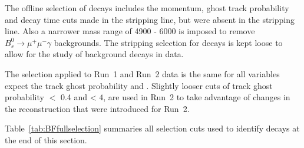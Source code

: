 The offline selection of \bmumu decays includes the momentum, ghost track probability and decay time cuts made in the \bhh stripping line, but were absent in the \bmumu stripping line. Also a narrower mass range of 4900 - 6000 \mevcc is imposed to remove $B_{s}^{0} \to \mu^{+} \mu^{-} \gamma$ backgrounds. The stripping selection for \bmumu decays is kept loose to allow for the study of background decays in data. 

The selection applied to Run~1 and Run~2 data is the same for all variables expect the track ghost probability and \chitrk. Slightly looser cuts of track ghost probability $<$ 0.4 and \chitrk < $4$, are used in Run~2 to take advantage of changes in the reconstruction that were introduced for Run~2. 

Table~\ref{tab:BFfullselection} summaries all selection cuts used to identify \bmumu %
decays at the end of this section.


